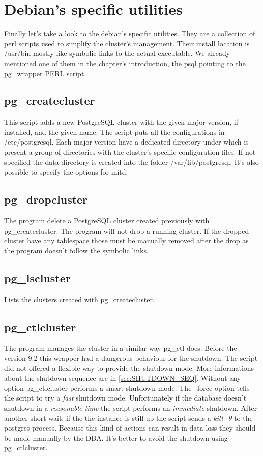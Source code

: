 \section{Debian's specific utilities}
Finally let's take a look to the debian's specific utilities. They are a collection of perl scripts 
used to simplify the cluster's management. Their install location is /usr/bin mostly like symbolic 
links to the actual executable. We already mentioned one of them in the chapter's introduction, the 
psql pointing to the pg\_wrapper PERL script.

\subsection{pg\_createcluster}
This script adds a new PostgreSQL cluster with the given major version, if installed, and the 
given name. The script puts all the configurations in /etc/postgresql. Each major version have a 
dedicated directory under which is present a group of directories with the cluster's specific 
configuration files. If not specified the data directory is created into the folder 
/var/lib/postgresql. It's also possible to specify the options for initd.

\subsection{pg\_dropcluster}
The program delete a PostgreSQL cluster created previously with pg\_createcluster. The 
program will not drop a running cluster. If the dropped cluster have any tablespace those must be 
manually removed after the drop as the program doesn't follow the symbolic links.

\subsection{pg\_lscluster}
Lists the clusters created with pg\_createcluster.

\subsection{pg\_ctlcluster}
\label{sub:PGCTLDEB}
The program manages the cluster in a similar way pg\_ctl does. 
Before the version 9.2 this wrapper had a dangerous behaviour for the shutdown. The script did not 
offered a flexible way to provide the shutdown mode. More informations about the shutdown 
sequence are in \ref{sec:SHUTDOWN_SEQ}. 
Without any option pg\_ctlcluster performs a smart shutdown mode.
The --force option tells the script to try a \textit{fast} shutdown mode. Unfortunately if the 
database doesn't shutdown in a \textit{reasonable time} the script performs an \textit{immediate} 
shutdown. After another short wait, if the the instance is still up the script sends a 
\textit{kill -9} to the postgres process. Because this kind of actions can result in data loss  
they should be made manually by the DBA. It's better to avoid the shutdown using pg\_ctlcluster.
